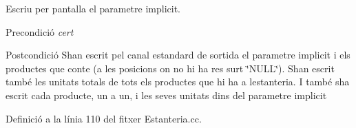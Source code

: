 Escriu per pantalla el parametre implicit. 

\begin{DoxyPrecond}{Precondició}
{\itshape cert} 
\end{DoxyPrecond}
\begin{DoxyPostcond}{Postcondició}
S\textquotesingle{}han escrit pel canal estandard de sortida el parametre implicit i els productes que conte (a les posicions on no hi ha res surt \char`\"{}\+N\+U\+L\+L\char`\"{}). S\textquotesingle{}han escrit també les unitats totals de tots els productes que hi ha a l\textquotesingle{}estanteria. I també s\textquotesingle{}ha escrit cada producte, un a un, i les seves unitats dins del parametre implicit 
\end{DoxyPostcond}


Definició a la línia 110 del fitxer Estanteria.\+cc.


